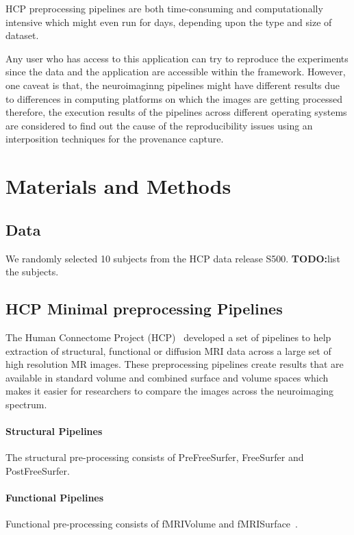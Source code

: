 \documentclass{article}
\newcommand{\todo}[1]{\color{red}\textbf{TODO:}#1\color{black}}
\begin{document}
HCP preprocessing pipelines are both time-consuming and
computationally intensive which might even run for days, depending
upon the type and size of dataset.

Any
user who has access to this application can try to reproduce the
experiments since the data and the application are accessible within
the framework. However, one caveat is that, the neuroimaginng
pipelines might have different results due to differences in computing
platforms on which the images are getting processed
~\cite{10.3389/conf.fninf.2014.18.00076} therefore, the execution
results of the pipelines across different operating systems are
considered to find out the cause of the reproducibility issues using
an interposition techniques for the provenance capture.


\section{Materials and Methods}

\subsection{Data}

We randomly selected 10 subjects from the HCP data release
S500. \todo{list the subjects.}

\subsection{HCP Minimal preprocessing Pipelines}

The Human Connectome Project (HCP)~\cite{Gla13} developed a set of
pipelines to help extraction of structural, functional or diffusion
MRI data across a large set of high resolution MR images. These
preprocessing pipelines create results that are available in standard
volume and combined surface and volume spaces which makes it easier
for researchers to compare the images across the neuroimaging
spectrum.

\paragraph{Structural Pipelines} The structural pre-processing consists of PreFreeSurfer, FreeSurfer and PostFreeSurfer. 
\paragraph{Functional Pipelines} Functional pre-processing consists of fMRIVolume and fMRISurface~\cite{FSL}. 
\end{document}
